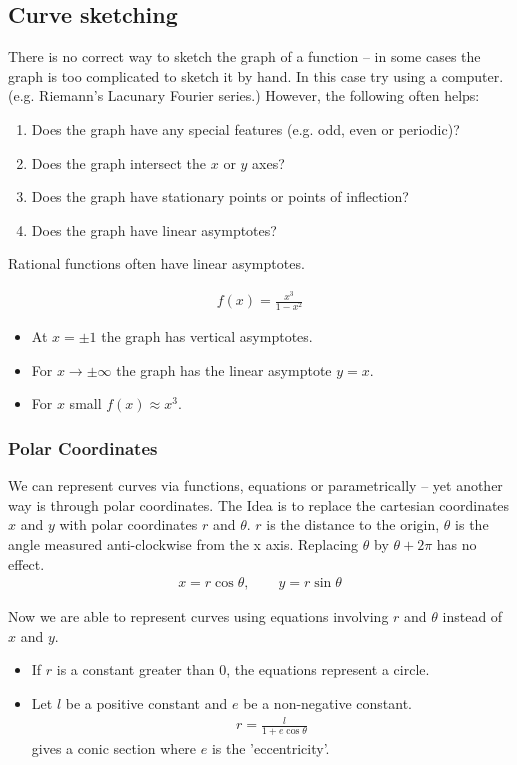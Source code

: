 \subsection{Curve sketching}
There is no correct way to sketch the graph of a function -- in some cases the graph is too complicated to sketch it by hand. In this case try using a computer.
(e.g. Riemann's Lacunary Fourier series.)
However, the following often helps:
\begin{enumerate}
\item
Does the graph have any special features (e.g. odd, even or periodic)?
\item
Does the graph intersect the $x$ or $y$ axes?
\item
Does the graph have stationary points or points of inflection?
\item
Does the graph have linear asymptotes?
\end{enumerate}
Rational functions often have linear asymptotes.
\begin{ex}
\begin{align*}
f(x) = \frac{x^3}{1-x^2}
\end{align*}
\begin{itemize}
\item
At $x = \pm 1$ the graph has vertical asymptotes. 
\item
For $x \to \pm \infty$ the graph has the linear asymptote $y= x $.
\item
For $x$ small $f(x) \approx x^3$.
\end{itemize}
\end{ex}


\subsubsection{Polar Coordinates}
We can represent curves via functions, equations or parametrically -- yet another way is through polar coordinates.
The Idea is to replace the cartesian coordinates $x$ and $y$ with polar coordinates $r$ and $\theta$. $r$ is the distance to the origin, $\theta$ is the angle measured anti-clockwise from the x axis. Replacing $\theta$ by $\theta +2 \pi$ has no effect.
\begin{align*}
x = r \cos \theta, \qquad y = r \sin \theta
\end{align*}

Now we are able to represent curves using equations involving $r$ and $\theta$ instead of $x$ and $y$.

\begin{ex}
\begin{itemize}
\item
If $r$ is a constant greater than 0, the equations represent a circle.
\item
Let $l$ be a positive constant and $e$ be a non-negative constant.
\begin{align*}
r = \frac l {1+e \cos \theta}
\end{align*}
gives a conic section where $e$ is the 'eccentricity'.
\end{itemize}
\end{ex}

